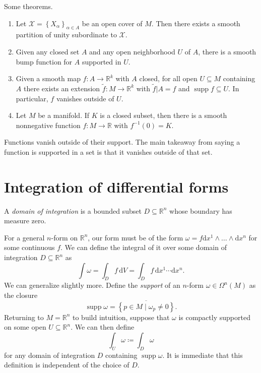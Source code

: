 Some theorems.
\begin{enumerate}
	\item Let $\mathcal{X} =\left\{ X_\alpha  \right\} _{\alpha \in A} $ be an open cover of $M$. Then there exists a smooth partition of unity subordinate to $\mathcal{X} $.
	\item Given any closed set $A$ and any open neighborhood $U$ of $A$, there is a smooth bump function for $A$ supported in $U$.
	\item Given a smooth map $f : A \to \mathbb{R} ^k$ with $A$ closed, for all open $U\subseteq M$ containing $A$ there exists an extension $\widetilde{f} : M \to \mathbb{R} ^k$ with $\widetilde{f} |A=f$ and $\operatorname{supp} f\subseteq U$. In particular, $f$ vanishes outside of $U$.
	\item Let $M$ be a manifold. If $K$ is a closed subset, then there is a smooth nonnegative function $f : M \to \mathbb{R} $ with $f^{-1} (0)=K$.
\end{enumerate}

\begin{remark}
	Functions vanish outside of their support. The main takeaway from saying a function is supported in a set is that it vanishes outside of that set.
\end{remark}




\section{Integration of differential forms}

\begin{definition}\label{5.2.1}
	A \emph{domain of integration} is a bounded subset $D\subseteq \mathbb{R} ^n$ whose boundary has measure zero.
\end{definition}

For a general $n$-form on $\mathbb{R} ^n$, our form must be of the form $\omega =f\mathrm{d} x^1 \wedge \ldots \wedge \mathrm{d} x^n$ for some continuous $f$. We can define the integral of it over some domain of integration $D\subseteq \mathbb{R} ^n$ as
\[
	\int \omega =\int_D f \,\mathrm{d} V=\int_D f \,\mathrm{d} x^1\cdots \mathrm{d} x^n
.\]
We can generalize slightly more. Define the \emph{support} of an $n$-form $\omega \in\Omega ^n(M)$ as the closure
\[
	\operatorname{supp} \omega =\overline{\left\{ p\in M\mid \omega _p\neq 0 \right\} }
.\]
Returning to $M=\mathbb{R} ^n$ to build intuition, suppose that $\omega $ is compactly supported on some open $U\subseteq \mathbb{R} ^n$. We can then define
\[
	\int_U\omega \coloneqq \int_D\omega 
\]
for any domain of integration $D$ containing $\operatorname{supp} \omega $. It is immediate that this definition is independent of the choice of $D$.
